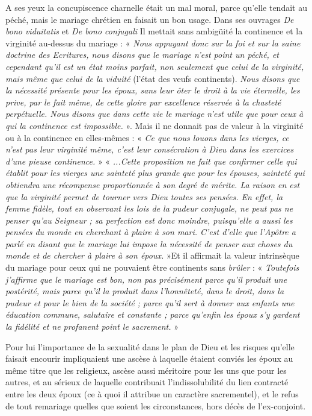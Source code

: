   A ses yeux la concupiscence charnelle était un mal moral, parce qu'elle tendait au péché, mais le mariage chrétien en faisait un bon usage. Dans ses ouvrages \emph{De  bono viduitatis} et \emph{De bono conjugali} Il mettait sans ambigüité la continence et la virginité au-dessus du mariage : « \emph{Nous appuyant donc sur la foi et sur la saine doctrine des Ecritures, nous disons que le mariage n'est point un péché, et cependant qu'il est un état moins parfait, non seulement que celui de la virginité, mais même que celui de la viduité} (l'état des veufs continents). \emph{Nous disons que la nécessité présente pour les époux, sans leur ôter le droit à la vie éternelle, les prive, par le fait même, de cette gloire par excellence réservée à la chasteté perpétuelle. Nous disons que dans cette vie le mariage n'est utile que pour ceux à qui la continence est impossible.} ». Mais il ne donnait pas de valeur à la virginité ou à la continence en elles-mêmes : « \emph{Ce que nous louons dans les vierges, ce n'est pas leur virginité même, c'est leur consécration à Dieu dans les exercices d'une pieuse continence.} » « \emph{...Cette proposition ne fait que confirmer celle qui établit pour les vierges une sainteté plus grande que pour les épouses, sainteté qui obtiendra une récompense proportionnée à son degré de mérite. La raison en est que la virginité permet de tourner vers Dieu toutes ses pensées. En effet, la femme fidèle, tout en observant les lois de la pudeur conjugale, ne peut pas ne penser qu'au Seigneur ; sa perfection est donc moindre, puisqu'elle a aussi les pensées du monde en cherchant à plaire à son mari. C'est d'elle que l'Apôtre a parlé en disant que le mariage lui impose la nécessité de penser aux choses du monde et de chercher à plaire à son époux.} »Et il affirmait la valeur intrinsèque du mariage pour ceux qui ne pouvaient être continents sans \emph{brûler} : « \emph{Toutefois j'affirme que le mariage est bon, non pas précisément parce qu'il produit une postérité, mais parce qu'il la produit dans l'honnêteté, dans le droit, dans la pudeur et pour le bien de la société ; parce qu'il sert à donner aux enfants une éducation commune, salutaire et constante ; parce qu'enfin les époux s'y gardent la fidélité et ne profanent point le sacrement.} »
  
Pour lui l'importance de la sexualité dans le plan de Dieu et les risques qu'elle faisait encourir impliquaient une ascèse à laquelle étaient conviés les époux au même titre que les religieux, ascèse aussi méritoire pour les uns que pour les autres, et au sérieux de laquelle contribuait l'indissolubilité du lien contracté entre les deux époux (ce à quoi il attribue un caractère sacrementel), et le refus de tout remariage quelles que soient les circonstances, hors décès de l'ex-conjoint. 

